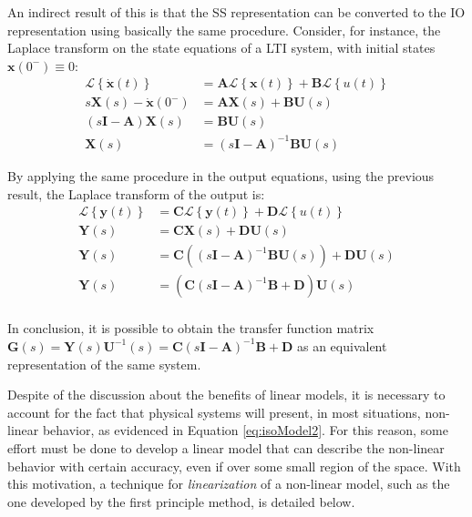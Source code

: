 \documentclass[a4paper,11pt]{book}
\numberwithin{figure}{chapter}
\numberwithin{equation}{chapter}
\numberwithin{table}{chapter}
\theoremstyle{definition}
\begin{document}
An indirect result of this is that the SS representation can be converted to the IO representation using basically the same procedure. Consider, for instance, the Laplace transform on the state equations of a LTI system, with initial states $\mathbf{x}(0^-) \equiv 0$:
\begin{equation} \label{eq:convertSSIO01}
\begin{split}
	\mathcal{L} \left\{ \dot{\mathbf{x}}(t) \right\} &= \mathbf{A} \mathcal{L} \left\{ \mathbf{x}(t) \right\} + \mathbf{B} \mathcal{L} \left\{ u(t) \right\} \\
	s \mathbf{X}(s) - \dot{\mathbf{x}}(0^-) &= \mathbf{A} \mathbf{X}(s) + \mathbf{B} \mathbf{U}(s) \\
	(s\mathbf{I}  - \mathbf{A}) \mathbf{X}(s) &=  \mathbf{B} \mathbf{U}(s) \\
	 \mathbf{X}(s) &= (s\mathbf{I}  - \mathbf{A})^{-1} \mathbf{B} \mathbf{U}(s)
\end{split}
\end{equation}

By applying the same procedure in the output equations, using the previous result, the Laplace transform of the output is:
\begin{equation} \label{eq:convertSSIO02}
\begin{split}
	\mathcal{L} \left\{ \mathbf{y}(t) \right\} &= \mathbf{C} \mathcal{L} \left\{ \mathbf{y}(t) \right\} + \mathbf{D} \mathcal{L} \left\{ u(t) \right\} \\
	\mathbf{Y}(s)  &= \mathbf{C} \mathbf{X}(s) + \mathbf{D} \mathbf{U}(s) \\
	\mathbf{Y}(s)  &= \mathbf{C} \left( (s\mathbf{I}  - \mathbf{A})^{-1} \mathbf{B} \mathbf{U}(s) \right) + \mathbf{D} \mathbf{U}(s) \\
	\mathbf{Y}(s)  &= \left( \mathbf{C} (s\mathbf{I} - \mathbf{A})^{-1} \mathbf{B}   + \mathbf{D} \right) \mathbf{U}(s) \\
\end{split}
\end{equation}

In conclusion, it is possible to obtain the transfer function matrix $\mathbf{G}(s) = \mathbf{Y}(s)\mathbf{U}^{-1}(s) = \mathbf{C} (s\mathbf{I} - \mathbf{A})^{-1} \mathbf{B}   + \mathbf{D}$ as an equivalent representation of the same system.

Despite of the discussion about the benefits of linear models, it is necessary to account for the fact that physical systems will present, in most situations, non-linear behavior, as evidenced in Equation \eqref{eq:isoModel2}. For this reason, some effort must be done to develop a linear model that can describe the non-linear behavior with certain accuracy, even if over some small region of the space. With this motivation, a technique for \textit{linearization} of a non-linear model, such as the one developed by the first principle method, is detailed below.
\end{document}
